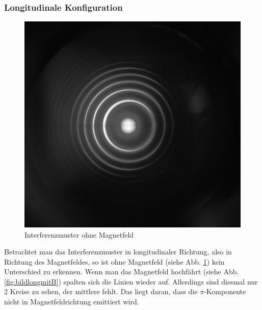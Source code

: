 \subsubsection{Longitudinale Konfiguration}
\begin{figure}
\centering
\includegraphics[scale=0.1]{data/bilder_okular/bild_5_edit.jpg}
\caption{Interferenzmuster ohne Magnetfeld}
\label{fig:bildlongohneB}
\end{figure}
Betrachtet man das Interferenzmuster in longitudinaler Richtung, also in Richtung des Magnetfeldes, so ist ohne Magnetfeld (siehe Abb. \ref{fig:bildlongohneB}) kein Unterschied zu erkennen. Wenn man das Magnetfeld hochfährt (siehe Abb. \ref{fig:bildlongmitB}) spalten sich die Linien wieder auf. Allerdings sind diesmal nur 2 Kreise zu sehen, der mittlere fehlt. Das liegt daran, dass die $\pi$-Komponente nicht in Magnetfeldrichtung emittiert wird.
